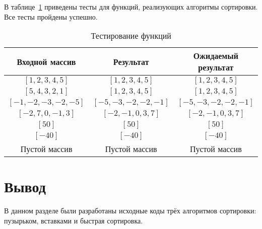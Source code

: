 

В таблице~\ref{tbl:test} приведены тесты для функций, реализующих алгоритмы сортировки. Все тесты пройдены успешно.

\begin{table}[h!]
    \begin{center}
        \begin{tabular}{|c|c|c|}
            \hline
            Входной массив & Результат & Ожидаемый результат \\
            \hline
            $[1, 2, 3, 4, 5]$ & $[1, 2, 3, 4, 5]$  & $[1, 2, 3, 4, 5]$\\\hline
            $[5, 4, 3, 2, 1]$  & $[1, 2, 3, 4, 5]$ & $[1, 2, 3, 4, 5]$\\\hline
            $[-1, -2, -3, -2, -5]$  & $[-5, -3, -2, -2, -1]$  & $[-5, -3, -2, -2, -1]$\\\hline
            $[-2, 7, 0, -1, 3]$  & $[-2, -1, 0, 3, 7]$  & $[-2, -1, 0, 3, 7]$\\\hline
            $[50]$  & $[50]$  & $[50]$\\\hline
            $[-40]$  & $[-40]$  & $[-40]$\\\hline
            Пустой массив  & Пустой массив  & Пустой массив\\
            \hline
        \end{tabular}
        \caption{\label{tbl:test}Тестирование функций}
    \end{center}
\end{table}

\section*{Вывод}

В данном разделе были разработаны исходные коды трёх алгоритмов сортировки: пузырьком, вставками и быстрая сортировка.

